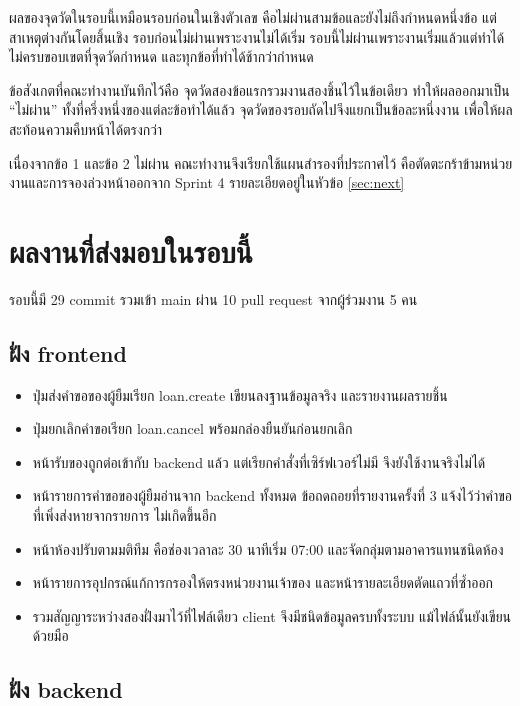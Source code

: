 ผลของจุดวัดในรอบนี้เหมือนรอบก่อนในเชิงตัวเลข คือไม่ผ่านสามข้อและยังไม่ถึงกำหนดหนึ่งข้อ แต่สาเหตุต่างกันโดยสิ้นเชิง รอบก่อนไม่ผ่านเพราะงานไม่ได้เริ่ม รอบนี้ไม่ผ่านเพราะงานเริ่มแล้วแต่ทำได้ไม่ครบขอบเขตที่จุดวัดกำหนด และทุกข้อที่ทำได้ช้ากว่ากำหนด

ข้อสังเกตที่คณะทำงานบันทึกไว้คือ จุดวัดสองข้อแรกรวมงานสองชิ้นไว้ในข้อเดียว ทำให้ผลออกมาเป็น ``ไม่ผ่าน'' ทั้งที่ครึ่งหนึ่งของแต่ละข้อทำได้แล้ว จุดวัดของรอบถัดไปจึงแยกเป็นข้อละหนึ่งงาน เพื่อให้ผลสะท้อนความคืบหน้าได้ตรงกว่า

เนื่องจากข้อ 1 และข้อ 2 ไม่ผ่าน คณะทำงานจึงเรียกใช้แผนสำรองที่ประกาศไว้ คือตัดตะกร้าข้ามหน่วยงานและการจองล่วงหน้าออกจาก Sprint 4 รายละเอียดอยู่ในหัวข้อ \ref{sec:next}

\clearpage
\section{ผลงานที่ส่งมอบในรอบนี้}

รอบนี้มี 29 commit รวมเข้า main ผ่าน 10 pull request จากผู้ร่วมงาน 5 คน

\subsection{ฝั่ง frontend}

\begin{itemize}
\item ปุ่มส่งคำขอของผู้ยืมเรียก loan.create เขียนลงฐานข้อมูลจริง และรายงานผลรายชิ้น
\item ปุ่มยกเลิกคำขอเรียก loan.cancel พร้อมกล่องยืนยันก่อนยกเลิก
\item หน้ารับของถูกต่อเข้ากับ backend แล้ว แต่เรียกคำสั่งที่เซิร์ฟเวอร์ไม่มี จึงยังใช้งานจริงไม่ได้
\item หน้ารายการคำขอของผู้ยืมอ่านจาก backend ทั้งหมด ข้อถดถอยที่รายงานครั้งที่ 3 แจ้งไว้ว่าคำขอที่เพิ่งส่งหายจากรายการ ไม่เกิดขึ้นอีก
\item หน้าห้องปรับตามมติทีม คือช่องเวลาละ 30 นาทีเริ่ม 07:00 และจัดกลุ่มตามอาคารแทนชนิดห้อง
\item หน้ารายการอุปกรณ์แก้การกรองให้ตรงหน่วยงานเจ้าของ และหน้ารายละเอียดตัดแถวที่ซ้ำออก
\item รวมสัญญาระหว่างสองฝั่งมาไว้ที่ไฟล์เดียว client จึงมีชนิดข้อมูลครบทั้งระบบ แม้ไฟล์นั้นยังเขียนด้วยมือ
\end{itemize}

\subsection{ฝั่ง backend}

